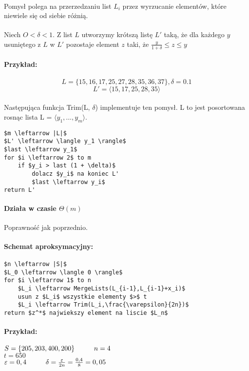 \paragraph{}{Pomysł polega na przerzedzaniu list $L_i$ przez wyrzucanie elementów, które niewiele się od siebie różnią.}
\paragraph{}{Niech $O<\delta <1$. Z list $L$ utworzymy krótszą listę $L'$ taką, że dla każdego $y$ usuniętego z $L$ w $L'$ pozostaje element $z$ taki, że $\frac{y}{1+\delta}\leq z\leq y$ }
\paragraph{Przykład:\\}{
$$L = \{ 15, 16, 17, 25, 27, 28, 35, 36, 37 \},  \delta = 0.1 $$
$$L' = \langle 15, 17, 25, 28, 35 \rangle $$}
\paragraph{}{Następująca funkcja Trim(L, $\delta$) implementuje ten pomysł. L to jest posortowana rosnąc lista L = $\langle y_1, ..., y_m \rangle$.}
\begin{lstlisting}[caption={Trim(L,$\delta$)}]
$m \leftarrow |L|$
$L' \leftarrow \langle y_1 \rangle$
$last \leftarrow y_1$
for $i \leftarrow 2$ to m
	if $y_i > last (1 + \delta)$
		dolacz $y_i$ na koniec L'
		$last \leftarrow y_i$
return L'
\end{lstlisting}

\paragraph{Działa w czasie $\Theta(m)$}{Poprawność jak poprzednio.}
\paragraph{Schemat aproksymacyjny:}
\begin{lstlisting}[caption={ApproxSubsetSum(S,t,$\varepsilon$)}]
$n \leftarrow |S|$
$L_0 \leftarrow \langle 0 \rangle$
for $i \leftarrow 1$ to n
	$L_i \leftarrow MergeLists(L_{i-1},L_{i-1}+x_i)$
	usun z $L_i$ wszystkie elementy $>$ t
	$L_i \leftarrow Trim(L_i,\frac{\varepsilon}{2n})$
return $z^*$ najwiekszy element na liscie $L_n$
\end{lstlisting}
\paragraph{Przykład:}{$S=\lbrace 205, 203, 400, 200\rbrace \hspace*{1cm} n=4$ \\ $t=650$ \\ $\varepsilon = 0,4 \hspace*{1cm} \delta=\frac{\varepsilon}{2n}=\frac{0,4}{8}=0,05$}

